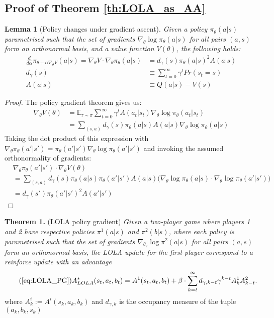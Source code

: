 \documentclass{article} \usepackage{iclr2025_conference,times}
\newtheorem{lemma}{Lemma}
\begin{document}
\subsection{Proof of Theorem \ref{th:LOLA_as_AA}}
\label{app:LOLA}
\begin{lemma}[Policy changes under gradient ascent]
Given a policy $\pi_\theta(a|s)$ parametrised such that the set of gradients $\nabla_\theta \log \pi_\theta(a|s)$ for all pairs $(a,s)$ form an orthonormal basis, and a value function $V(\theta)$, the following holds:
\begin{align}
    \frac{d}{d\alpha}\pi_{\theta + \alpha \nabla_\theta V}(a|s) = \nabla_{\theta} V \cdot \nabla_\theta \pi_\theta(a|s) &=  d_{\gamma}(s) \pi_{\theta}(a|s)^2 A(a|s)\\
    d_{\gamma}(s) &\equiv \sum_{t=0}^{\infty} \gamma^t Pr(s_t = s)\\
    A(a|s) &\equiv Q(a|s) - V(s)
\end{align}
\end{lemma}
\begin{proof}
The policy gradient theorem gives us:
\begin{align}
    \nabla_{\theta}V(\theta) &= \mathbb{E}_{\tau \sim \pi} \sum_{t=0}^{\infty}\gamma^t A(a_t|s_t) \nabla_\theta \log \pi_{\theta}(a_t|s_t)\\
    &= \sum_{(s,a)} d_{\gamma}(s) \pi_{\theta}(a|s) A(a|s)\nabla_\theta \log \pi_\theta(a|s)
\end{align}
Taking the dot product of this expression with $\nabla_\theta \pi_\theta (a'|s') = \pi_\theta(a'|s') \nabla_\theta \log \pi_\theta(a'|s')$ and invoking the assumed orthonormality of gradients:
\begin{align}
    &\nabla_\theta \pi_\theta (a'|s') \cdot \nabla_{\theta}V(\theta) \\
    &=\sum_{(s,a)} d_{\gamma}(s) \pi_{\theta}(a|s)\pi_{\theta}(a'|s') A(a|s) \bigg(\nabla_\theta \log \pi_\theta(a|s) \cdot \nabla_\theta \log \pi_\theta(a'|s')\bigg)\\
    &= d_{\gamma}(s') \pi_{\theta}(a'|s')^2 A(a'|s')
\end{align}

\end{proof}







\textbf{Theorem 1.} (LOLA policy gradient)
\textit{Given a two-player game where players 1 and 2 have respective policies $\pi^1(a|s)$ and $\pi^2(b|s)$, where each policy is parametrised such that the set of gradients $\nabla_{\theta_2} \log \pi^2(a|s)$ for all pairs $(a,s)$ form an orthonormal basis, the LOLA update for the first player correspond to a reinforce update with an advantage 
\begin{equation}
    \tag{\ref{eq:LOLA_PG}}
     A_{LOLA}^*(s_t, a_t, b_t) = A^1(s_t, a_t, b_t) + \beta \cdot \sum_{k=t}^\infty d_{\gamma,{k-t}} \gamma^{k-t}  A^1_kA^2_{k-t}  .
\end{equation}}
where $A^i_k :=  A^{i}(s_k, a_k, b_k)$ and $d_{\gamma,k}$ is the occupancy measure of the tuple $(a_k,b_k,s_k)$
\end{document}
